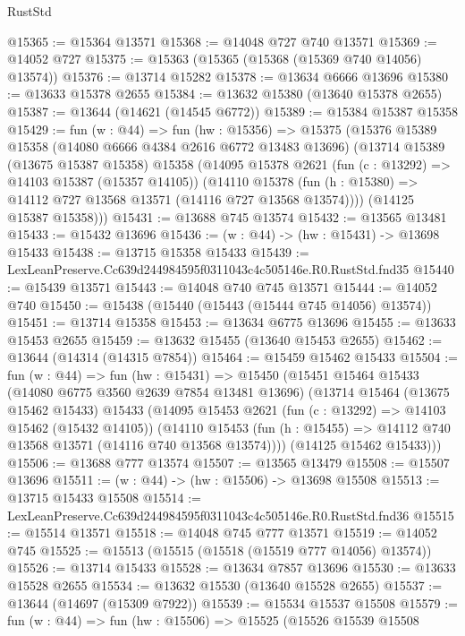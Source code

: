 \begin{lexlean}{RustStd}
\begin{coremodule}
@15365 := @15364 @13571
@15368 := @14048 @727 @740 @13571
@15369 := @14052 @727
@15375 := @15363 (@15365 (@15368 (@15369 @740 @14056) @13574))
@15376 := @13714 @15282
@15378 := @13634 @6666 @13696
@15380 := @13633 @15378 @2655
@15384 := @13632 @15380 (@13640 @15378 @2655)
@15387 := @13644 (@14621 (@14545 @6772))
@15389 := @15384 @15387 @15358
@15429 := fun (w : @44) =>
  fun (hw : @15356) =>
  @15375
    (@15376
      @15389
      @15358
      (@14080 @6666 @4384 @2616 @6772 @13483 @13696)
      (@13714
        @15389
        (@13675 @15387 @15358)
        @15358
        (@14095
          @15378
          @2621
          (fun (c : @13292) => @14103 @15387 (@15357 @14105))
          (@14110
            @15378
            (fun (h : @15380) => @14112 @727 @13568 @13571 (@14116 @727 @13568 @13574))))
        (@14125 @15387 @15358)))
@15431 := @13688 @745 @13574
@15432 := @13565 @13481
@15433 := @15432 @13696
@15436 := (w : @44) -> (hw : @15431) -> @13698 @15433
@15438 := @13715 @15358 @15433
@15439 := LexLeanPreserve.Cc639d244984595f0311043c4c505146e.R0.RustStd.fnd35
@15440 := @15439 @13571
@15443 := @14048 @740 @745 @13571
@15444 := @14052 @740
@15450 := @15438 (@15440 (@15443 (@15444 @745 @14056) @13574))
@15451 := @13714 @15358
@15453 := @13634 @6775 @13696
@15455 := @13633 @15453 @2655
@15459 := @13632 @15455 (@13640 @15453 @2655)
@15462 := @13644 (@14314 (@14315 @7854))
@15464 := @15459 @15462 @15433
@15504 := fun (w : @44) =>
  fun (hw : @15431) =>
  @15450
    (@15451
      @15464
      @15433
      (@14080 @6775 @3560 @2639 @7854 @13481 @13696)
      (@13714
        @15464
        (@13675 @15462 @15433)
        @15433
        (@14095
          @15453
          @2621
          (fun (c : @13292) => @14103 @15462 (@15432 @14105))
          (@14110
            @15453
            (fun (h : @15455) => @14112 @740 @13568 @13571 (@14116 @740 @13568 @13574))))
        (@14125 @15462 @15433)))
@15506 := @13688 @777 @13574
@15507 := @13565 @13479
@15508 := @15507 @13696
@15511 := (w : @44) -> (hw : @15506) -> @13698 @15508
@15513 := @13715 @15433 @15508
@15514 := LexLeanPreserve.Cc639d244984595f0311043c4c505146e.R0.RustStd.fnd36
@15515 := @15514 @13571
@15518 := @14048 @745 @777 @13571
@15519 := @14052 @745
@15525 := @15513 (@15515 (@15518 (@15519 @777 @14056) @13574))
@15526 := @13714 @15433
@15528 := @13634 @7857 @13696
@15530 := @13633 @15528 @2655
@15534 := @13632 @15530 (@13640 @15528 @2655)
@15537 := @13644 (@14697 (@15309 @7922))
@15539 := @15534 @15537 @15508
@15579 := fun (w : @44) =>
  fun (hw : @15506) =>
  @15525
    (@15526
      @15539
      @15508

\end{coremodule}
\end{lexlean}
